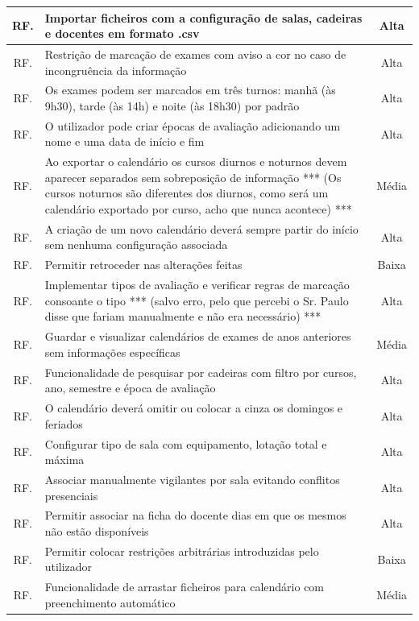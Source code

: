 \documentclass[11pt, twoside]{report}
\begin{document}
\begin{center}
\begin{tabularx}{\textwidth}{|c|X|c|}
				RF. & Importar ficheiros com a configuração de salas, cadeiras e docentes em formato .csv & Alta \\
				\hline
				RF. &  Restrição de marcação de exames com aviso a cor no caso de incongruência da informação & Alta \\
				\hline
				RF. & Os exames podem ser marcados em três turnos: manhã (às 9h30), tarde (às 14h) e noite (às 18h30) por padrão & Alta \\
				\hline
				RF. & O utilizador pode criar épocas de avaliação adicionando um nome e uma data de início e fim & Alta \\
				\hline
				RF. & Ao exportar o calendário os cursos diurnos e noturnos devem aparecer separados sem sobreposição de informação *** (Os cursos noturnos são diferentes dos diurnos, como será um calendário exportado por curso, acho que nunca acontece) *** & Média \\
				\hline
				RF. & A criação de um novo calendário deverá sempre partir do início sem nenhuma configuração associada & Alta\\
				\hline
				RF. & Permitir retroceder nas alterações feitas & Baixa \\
				\hline
				RF. & Implementar tipos de avaliação e verificar regras de marcação consoante o tipo *** (salvo erro, pelo que percebi o Sr. Paulo disse que fariam manualmente e não era necessário) *** & Alta \\
				\hline
				RF. & Guardar e visualizar calendários de exames de anos anteriores sem informações específicas  & Média \\
				\hline
				RF.  & Funcionalidade de pesquisar por cadeiras com filtro por cursos, ano, semestre e época de avaliação  & Alta \\
				\hline
				RF. & O calendário deverá omitir ou colocar a cinza os domingos e feriados & Alta \\
				\hline
				RF. & Configurar tipo de sala com equipamento, lotação total e máxima & Alta \\
				\hline
				RF. & Associar manualmente vigilantes por sala evitando conflitos presenciais & Alta \\
				\hline
				RF. & Permitir associar na ficha do docente dias em que os mesmos não estão disponíveis & Alta\\
				\hline
				\pagebreak
				RF. & Permitir colocar restrições arbitrárias introduzidas pelo utilizador & Baixa \\
				\hline
				RF.  & Funcionalidade de arrastar ficheiros para calendário com preenchimento automático & Média \\

\end{tabularx}
\end{center}
\end{document}
